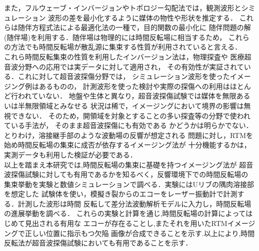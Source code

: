 また，フルウェーブ・インバージョンやトポロジー勾配法では，観測波形とシミュレーション
波形の差を最小化するように媒体の物性や形状を推定する．
これらは随伴方程式法による最適化法の一種で，目的関数の最小化に
随伴問題の解(随伴場)を利用する．随伴場は物理的には時間反転場に相当するため，
これらの方法でも時間反転場が散乱源に集束する性質が利用されていると言える．
\\
\hspace{\parindent}
これら時間反転集束の性質を利用したインバージョン法は，物理探査\cite{Fichtner, Etgen2009}や
医療超音波分野\cite{FinkTextBook, Tanter2000}への応用では実データに対して適用され，
その有効性が実証されている．これに対して超音波探傷分野では，
シミュレーション波形を使ったイメージング例\cite{KK_RTM,Saitoh2021}はあるものの，
計測波形を使った検討や実際の探傷への利用はほとんど行われていない．
地盤や生体と異なり，超音波探傷試験では媒体を無限あるいは半無限領域とみなせる
状況は稀で，イメージングにおいて境界の影響は無視できない．
そのため，開領域を対象とすることの多い探査等の分野で使われている手法が，
そのまま超音波探傷にも有効である
かどうかは明らかでない．とりわけ，溶接継手部のような波動場の反響が想定される
問題に対し，RTMを始め時間反転場の集束に成否が依存するイメージング法が
十分機能するかは，実測データも利用した検証が必要である．
\\
\hspace{\parindent}
以上を踏まえ本研究では,時間反転場の集束に基礎を持つイメージング法が
超音波探傷試験に対しても有用であるかを知るべく，反響環境下での時間反転場の
集束挙動を実験と数値シミュレーションで調べる．実験にはUリブの隅肉溶接部を想定した
試験体を使い，模擬き裂からのエコーをレーザー振動計で計測する．計測した波形は時間
反転して差分法波動解析モデルに入力し，時間反転場の進展挙動を調べる．
これらの実験と計算を通じ,時間反転場の計算によってはじめて見出される有用な
エコーが存在ることし,またそれを用いたRTMイメージングで正しい位置に指示もつ欠陥
画像が合成できることを示す.以上により,時間反転法が超音波探傷試験においても有用であることを示す．

